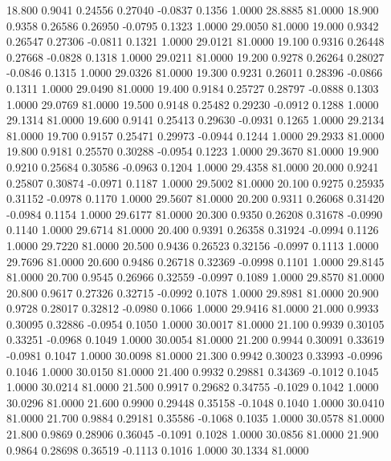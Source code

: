   18.800   0.9041   0.24556   0.27040  -0.0837   0.1356   1.0000  28.8885  81.0000
  18.900   0.9358   0.26586   0.26950  -0.0795   0.1323   1.0000  29.0050  81.0000
  19.000   0.9342   0.26547   0.27306  -0.0811   0.1321   1.0000  29.0121  81.0000
  19.100   0.9316   0.26448   0.27668  -0.0828   0.1318   1.0000  29.0211  81.0000
  19.200   0.9278   0.26264   0.28027  -0.0846   0.1315   1.0000  29.0326  81.0000
  19.300   0.9231   0.26011   0.28396  -0.0866   0.1311   1.0000  29.0490  81.0000
  19.400   0.9184   0.25727   0.28797  -0.0888   0.1303   1.0000  29.0769  81.0000
  19.500   0.9148   0.25482   0.29230  -0.0912   0.1288   1.0000  29.1314  81.0000
  19.600   0.9141   0.25413   0.29630  -0.0931   0.1265   1.0000  29.2134  81.0000
  19.700   0.9157   0.25471   0.29973  -0.0944   0.1244   1.0000  29.2933  81.0000
  19.800   0.9181   0.25570   0.30288  -0.0954   0.1223   1.0000  29.3670  81.0000
  19.900   0.9210   0.25684   0.30586  -0.0963   0.1204   1.0000  29.4358  81.0000
  20.000   0.9241   0.25807   0.30874  -0.0971   0.1187   1.0000  29.5002  81.0000
  20.100   0.9275   0.25935   0.31152  -0.0978   0.1170   1.0000  29.5607  81.0000
  20.200   0.9311   0.26068   0.31420  -0.0984   0.1154   1.0000  29.6177  81.0000
  20.300   0.9350   0.26208   0.31678  -0.0990   0.1140   1.0000  29.6714  81.0000
  20.400   0.9391   0.26358   0.31924  -0.0994   0.1126   1.0000  29.7220  81.0000
  20.500   0.9436   0.26523   0.32156  -0.0997   0.1113   1.0000  29.7696  81.0000
  20.600   0.9486   0.26718   0.32369  -0.0998   0.1101   1.0000  29.8145  81.0000
  20.700   0.9545   0.26966   0.32559  -0.0997   0.1089   1.0000  29.8570  81.0000
  20.800   0.9617   0.27326   0.32715  -0.0992   0.1078   1.0000  29.8981  81.0000
  20.900   0.9728   0.28017   0.32812  -0.0980   0.1066   1.0000  29.9416  81.0000
  21.000   0.9933   0.30095   0.32886  -0.0954   0.1050   1.0000  30.0017  81.0000
  21.100   0.9939   0.30105   0.33251  -0.0968   0.1049   1.0000  30.0054  81.0000
  21.200   0.9944   0.30091   0.33619  -0.0981   0.1047   1.0000  30.0098  81.0000
  21.300   0.9942   0.30023   0.33993  -0.0996   0.1046   1.0000  30.0150  81.0000
  21.400   0.9932   0.29881   0.34369  -0.1012   0.1045   1.0000  30.0214  81.0000
  21.500   0.9917   0.29682   0.34755  -0.1029   0.1042   1.0000  30.0296  81.0000
  21.600   0.9900   0.29448   0.35158  -0.1048   0.1040   1.0000  30.0410  81.0000
  21.700   0.9884   0.29181   0.35586  -0.1068   0.1035   1.0000  30.0578  81.0000
  21.800   0.9869   0.28906   0.36045  -0.1091   0.1028   1.0000  30.0856  81.0000
  21.900   0.9864   0.28698   0.36519  -0.1113   0.1016   1.0000  30.1334  81.0000
